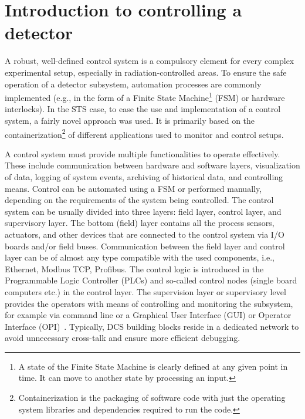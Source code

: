 \section{Introduction to controlling a detector}
A robust, well-defined control system is a compulsory element for every complex experimental setup, especially in radiation-controlled areas. To ensure the safe operation of a detector subsystem, automation processes are commonly implemented (e.g., in the form of a Finite State Machine\footnote{A state of the Finite State Machine is clearly defined at any given point in time. It can move to another state by processing an input.} (\gls{FSM}) or hardware interlocks). In the \gls{STS} case, to ease the use and implementation of a control system, a fairly novel approach was used. It is primarily based on the containerization\footnote{Containerization is the packaging of software code with just the operating system libraries and dependencies required to run the code.} of different applications used to monitor and control setups. 




A control system must provide multiple functionalities to operate effectively. These include communication between hardware and software layers, visualization of data, logging of system events, archiving of historical data, and controlling means. Control can be automated using a \gls{FSM} or performed manually, depending on the requirements of the system being controlled. The control system can be usually divided into three layers: field layer, control layer, and supervisory layer. The bottom (field) layer contains all the process sensors, actuators, and other devices that are connected to the control system via I/O boards and/or field buses. Communication between the field layer and control layer can be of almost any type compatible with the used components, i.e., Ethernet, Modbus \gls{TCP}, Profibus. The control logic is introduced in the Programmable Logic Controller (\glspl{PLC}) and so-called control nodes (single board computers etc.) in the control layer. The supervision layer or supervisory level provides the operators with means of controlling and monitoring the subsystem, for example via command line or a Graphical User Interface (\gls{GUI}) or Operator Interface (\gls{OPI})~\cite{layers}.  Typically, DCS building blocks reside in a dedicated network to avoid unnecessary cross-talk and ensure more efficient debugging.

